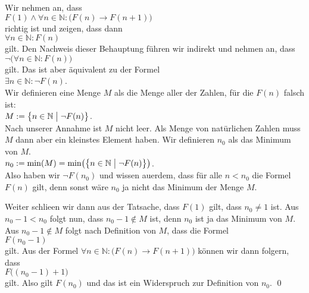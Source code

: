 \proof
Wir nehmen an, dass
\\[0.2cm]
\hspace*{1.3cm}
$F(1) \wedge \forall n \in \mathbb{N}:\bigl(F(n) \rightarrow F(n+1)\bigr)$
\\[0.2cm]
richtig ist und zeigen, dass dann
\\[0.2cm]
\hspace*{1.3cm}
$\forall n \in \mathbb{N}:F(n)$
\\[0.2cm]
gilt.  Den Nachweis dieser Behauptung f\"{u}hren wir indirekt und nehmen an, dass
\\[0.2cm]
\hspace*{1.3cm}
$\neg\bigl(\forall n \in \mathbb{N}:F(n)\bigr)$
\\[0.2cm]
gilt.  Das ist aber \"{a}quivalent zu der Formel
\\[0.2cm]
\hspace*{1.3cm}
$\exists n \in \mathbb{N}:\neg F(n)$.
\\[0.2cm]
Wir definieren eine Menge $M$ als die Menge aller der Zahlen, f\"{u}r die $F(n)$ falsch ist:
\\[0.2cm]
\hspace*{1.3cm}
$M := \bigl\{ n \in \mathbb{N} \bigm| \neg F(n) \bigr\}$.
\\[0.2cm]
Nach unserer Annahme ist $M$ nicht leer.  Als Menge von nat\"{u}rlichen Zahlen muss  $M$ dann aber ein
kleinstes Element haben.  Wir definieren $n_0$ als das Minimum von $M$.
\\[0.2cm]
\hspace*{1.3cm}
$n_0 := \min( M) = \min\bigl(\bigl\{ n \in \mathbb{N} \bigm| \neg F(n) \bigr\}\bigr)$.
\\[0.2cm]
Also haben wir $\neg F(n_0)$ und wissen au\3erdem, dass f\"{u}r alle $n < n_0$ die Formel $F(n)$ gilt, denn
sonst w\"{a}re $n_0$ ja nicht das Minimum der Menge $M$.

Weiter schlie\3en wir dann aus der Tatsache, dass $F(1)$ gilt, dass $n_0 \not= 1$ ist.  
Aus $n_0 -1 < n_0$ folgt nun, dass $n_0-1 \not\in M$ ist, denn $n_0$ ist ja das Minimum von $M$.
Aus  $n_0-1 \not\in M$ folgt nach Definition von $M$, dass die Formel
\\[0.2cm]
\hspace*{1.3cm}
$F(n_0 - 1)$
\\[0.2cm]
gilt.  Aus der Formel $\forall n \in \mathbb{N}:\bigl( F(n) \rightarrow F(n+1)\bigr)$ k\"{o}nnen wir dann folgern, dass
\\[0.2cm]
\hspace*{1.3cm}
$F\bigl((n_0-1) +1\bigr)$
\\[0.2cm] 
gilt.  Also gilt $F(n_0)$ und das ist ein Widerspruch zur Definition von $n_0$. \qed

